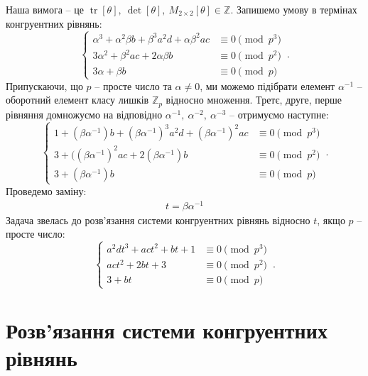 \documentclass{thesis}
\DeclareMathOperator{\tr}{tr}
\begin{document}
Наша вимога -- це $\tr [\theta],\ \det [\theta],\ M_{2 \times 2}[\theta] \in \mathbb{Z}$. Запишемо умову в термінах конгруентних рівнянь:
\begin{equation}
    \begin{cases}
      \alpha^3 + \alpha^2 \beta b + \beta^3 a^2 d + \alpha \beta^2 a c & \equiv 0 \pmod {p^3} \\
    3\alpha^2 + \beta^2 ac + 2 \alpha \beta b & \equiv 0 \pmod {p^2} \\
      3 \alpha + \beta b & \equiv 0 \pmod p 
    \end{cases}\,.
\end{equation}
Припускаючи, що $p$ -- просте число та $\alpha \neq 0$, ми можемо підібрати елемент $\alpha^{-1}$ -- оборотний елемент класу лишків $\mathbb{Z}_p$ відносно множення. Третє, друге, перше рівняння домножуємо на відповідно $\alpha^{-1},\ \alpha^{-2},\ \alpha^{-3}$ -- отримуємо наступне:
\begin{equation*}
    \begin{cases}
      1 + (\beta \alpha^{-1}) b + (\beta \alpha^{-1})^{3} a^2 d + (\beta \alpha^{-1})^2 a c & \equiv 0 \pmod {p^3} \\
    3 + ((\beta \alpha^{-1})^2 ac + 2 (\beta \alpha^{-1}) b & \equiv 0 \pmod {p^2} \\
      3 + (\beta \alpha^{-1})b & \equiv 0 \pmod p 
    \end{cases}\,.
\end{equation*}
Проведемо заміну:
\begin{align}
t = \beta \alpha^{-1}
\end{align}
Задача звелась до розв'язання системи конгруентних рівнянь відносно $t$, якщо $p$ -- просте число: 
\begin{equation}
    \begin{cases}
      a^2 d t^3 + ac t^2 + bt + 1 & \equiv 0 \pmod {p^3} \\
      act^2 + 2bt + 3 & \equiv 0 \pmod {p^2} \\
      3 + bt & \equiv 0 \pmod p 
    \end{cases}\,.
\end{equation}

\section{Розв'язання системи конгруентних рівнянь}
\end{document}
